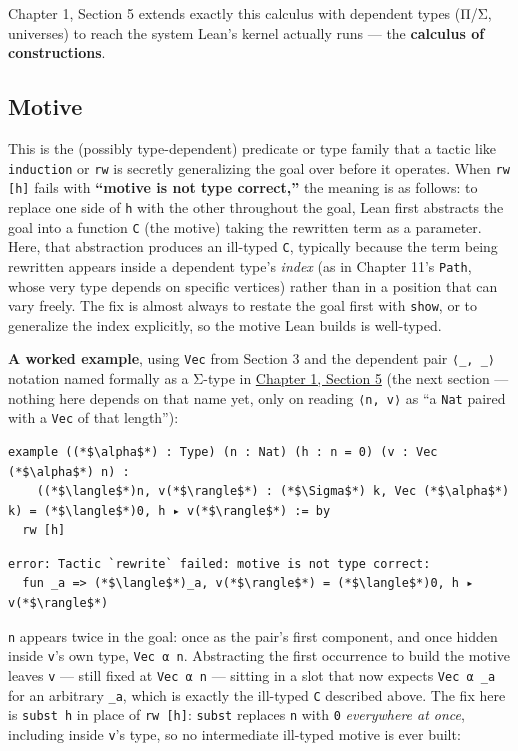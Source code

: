 Chapter 1, Section 5 extends exactly this calculus with dependent types (Π/Σ, universes) to reach the system Lean's kernel actually runs --- the \textbf{calculus of constructions}.

\subsection{Motive}\label{sec:01-basics:04-terminology:6}

This is the (possibly type-dependent) predicate or type family that a tactic like \texttt{induction} or \texttt{rw} is secretly generalizing the goal over before it operates. When \texttt{rw [h]} fails with \textbf{``motive is not type correct,''} the meaning is as follows: to replace one side of \texttt{h} with the other throughout the goal, Lean first abstracts the goal into a function \texttt{C} (the motive) taking the rewritten term as a parameter. Here, that abstraction produces an ill-typed \texttt{C}, typically because the term being rewritten appears inside a dependent type's \emph{index} (as in Chapter 11's \texttt{Path}, whose very type depends on specific vertices) rather than in a position that can vary freely. The fix is almost always to restate the goal first with \texttt{show}, or to generalize the index explicitly, so the motive Lean builds is well-typed.

\textbf{A worked example}, using \texttt{Vec} from Section 3 and the dependent pair \texttt{⟨\_\allowbreak{}, \_\allowbreak{}⟩} notation named formally as a Σ-type in \hyperref[sec:01-basics:05-pi-sigma-and-coc:1]{Chapter 1, Section 5} (the next section --- nothing here depends on that name yet, only on reading \texttt{⟨n, v⟩} as ``a \texttt{Nat} paired with a \texttt{Vec} of that length''):

\begin{lstlisting}
example ((*$\alpha$*) : Type) (n : Nat) (h : n = 0) (v : Vec (*$\alpha$*) n) :
    ((*$\langle$*)n, v(*$\rangle$*) : (*$\Sigma$*) k, Vec (*$\alpha$*) k) = (*$\langle$*)0, h ▸ v(*$\rangle$*) := by
  rw [h]
\end{lstlisting}

\begin{lstlisting}
error: Tactic `rewrite` failed: motive is not type correct:
  fun _a => (*$\langle$*)_a, v(*$\rangle$*) = (*$\langle$*)0, h ▸ v(*$\rangle$*)
\end{lstlisting}

\texttt{n} appears twice in the goal: once as the pair's first component, and once hidden inside \texttt{v}'s own type, \texttt{Vec α n}. Abstracting the first occurrence to build the motive leaves \texttt{v} --- still fixed at \texttt{Vec α n} --- sitting in a slot that now expects \texttt{Vec α \_\allowbreak{}a} for an arbitrary \texttt{\_\allowbreak{}a}, which is exactly the ill-typed \texttt{C} described above. The fix here is \texttt{subst h} in place of \texttt{rw [h]}: \texttt{subst} replaces \texttt{n} with \texttt{0} \emph{everywhere at once}, including inside \texttt{v}'s type, so no intermediate ill-typed motive is ever built:

